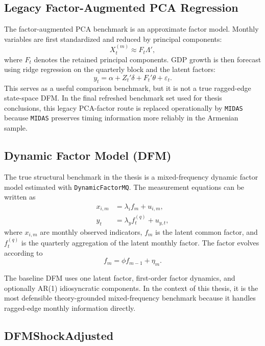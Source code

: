 \documentclass[12pt,a4paper]{article}
\begin{document}
\subsection{Legacy Factor-Augmented PCA Regression}

The factor-augmented PCA benchmark is an approximate factor model. Monthly variables are first standardized and reduced by principal components:
\begin{equation}
    X^{(m)}_t \approx F_t \Lambda',
\end{equation}
where $F_t$ denotes the retained principal components. GDP growth is then forecast using ridge regression on the quarterly block and the latent factors:
\begin{equation}
    y_t = \alpha + Z_t' \delta + F_t' \theta + \varepsilon_t.
\end{equation}
This serves as a useful comparison benchmark, but it is not a true ragged-edge state-space DFM. In the final refreshed benchmark set used for thesis conclusions, this legacy PCA-factor route is replaced operationally by \texttt{MIDAS} because \texttt{MIDAS} preserves timing information more reliably in the Armenian sample.

\subsection{Dynamic Factor Model (DFM)}

The true structural benchmark in the thesis is a mixed-frequency dynamic factor model estimated with \texttt{DynamicFactorMQ}. The measurement equations can be written as
\begin{align}
    x_{i,m} &= \lambda_i f_m + u_{i,m}, \\
    y_t &= \lambda_y f_t^{(q)} + u_{y,t},
\end{align}
where $x_{i,m}$ are monthly observed indicators, $f_m$ is the latent common factor, and $f_t^{(q)}$ is the quarterly aggregation of the latent monthly factor. The factor evolves according to
\begin{equation}
    f_m = \phi f_{m-1} + \eta_m.
\end{equation}

The baseline DFM uses one latent factor, first-order factor dynamics, and optionally AR(1) idiosyncratic components. In the context of this thesis, it is the most defensible theory-grounded mixed-frequency benchmark because it handles ragged-edge monthly information directly.

\subsection{DFMShockAdjusted}
\end{document}
